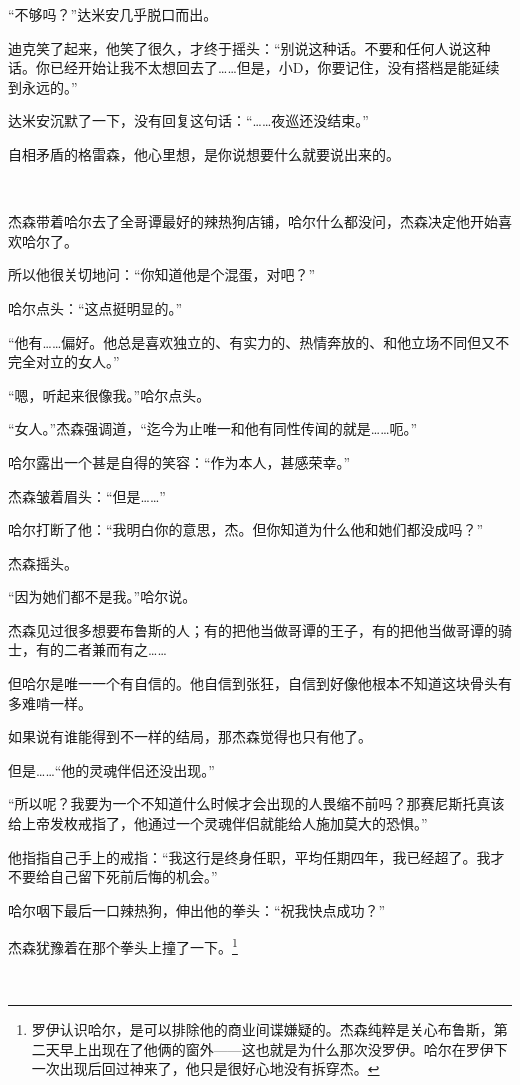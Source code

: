 \documentclass[../main.tex]{subfiles}
\begin{document}
“不够吗？”达米安几乎脱口而出。

迪克笑了起来，他笑了很久，才终于摇头：“别说这种话。不要和任何人说这种话。你已经开始让我不太想回去了……但是，小D，你要记住，没有搭档是能延续到永远的。”

达米安沉默了一下，没有回复这句话：“……夜巡还没结束。”

自相矛盾的格雷森，他心里想，是你说想要什么就要说出来的。

~\

杰森带着哈尔去了全哥谭最好的辣热狗店铺，哈尔什么都没问，杰森决定他开始喜欢哈尔了。

所以他很关切地问：“你知道他是个混蛋，对吧？”

哈尔点头：“这点挺明显的。”

“他有……偏好。他总是喜欢独立的、有实力的、热情奔放的、和他立场不同但又不完全对立的女人。”

“嗯，听起来很像我。”哈尔点头。

“女人。”杰森强调道，“迄今为止唯一和他有同性传闻的就是……呃。”

哈尔露出一个甚是自得的笑容：“作为本人，甚感荣幸。”

杰森皱着眉头：“但是……”

哈尔打断了他：“我明白你的意思，杰。但你知道为什么他和她们都没成吗？”

杰森摇头。

“因为她们都不是我。”哈尔说。

杰森见过很多想要布鲁斯的人；有的把他当做哥谭的王子，有的把他当做哥谭的骑士，有的二者兼而有之……

但哈尔是唯一一个有自信的。他自信到张狂，自信到好像他根本不知道这块骨头有多难啃一样。

如果说有谁能得到不一样的结局，那杰森觉得也只有他了。

但是……“他的灵魂伴侣还没出现。”

“所以呢？我要为一个不知道什么时候才会出现的人畏缩不前吗？那赛尼斯托真该给上帝发枚戒指了，他通过一个灵魂伴侣就能给人施加莫大的恐惧。”

他指指自己手上的戒指：“我这行是终身任职，平均任期四年，我已经超了。我才不要给自己留下死前后悔的机会。”

哈尔咽下最后一口辣热狗，伸出他的拳头：“祝我快点成功？”

杰森犹豫着在那个拳头上撞了一下。\footnote[1]{罗伊认识哈尔，是可以排除他的商业间谍嫌疑的。杰森纯粹是关心布鲁斯，第二天早上出现在了他俩的窗外——这也就是为什么那次没罗伊。哈尔在罗伊下一次出现后回过神来了，他只是很好心地没有拆穿杰。}

~\
\end{document}
